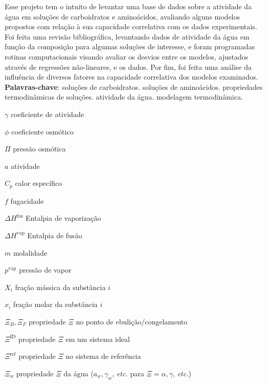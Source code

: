 \documentclass[
	12pt,				%
	openright,
	twoside,
	a4paper,			%
	english,			%
	french,				%
	spanish,			%
	brazil				%
	]{abntex2}
\begin{document}

\frenchspacing

\imprimircapa

\imprimirfolhaderosto


\setlength{\absparsep}{18pt}
\begin{resumo}
	Esse projeto tem o intuito de levantar uma base de dados sobre a
	atividade da água em soluções de carboidratos e aminoácidos,
	avaliando alguns modelos propostos com relação à sua capacidade
	correlativa com os dados experimentais. Foi feita uma revisão
	bibliográfica, levantando dados de atividade da água em função da
	composição para algumas soluções de interesse, e foram programadas
	rotinas computacionais visando avaliar os desvios entre os modelos,
	ajustados através de regressões não-lineares, e os dados. Por fim,
	foi feita uma análise da influência de diversos fatores na capacidade
	correlativa dos modelos examinados.\\
	\textbf{Palavras-chave}: soluções de carboidratos.
			soluções de aminoácidos.
			propriedades termodinâmicas de soluções.
			atividade da água.
			modelagem termodinâmica.
\end{resumo}

\listoffigures*
\cleardoublepage


\listoftables*
\cleardoublepage

\begin{simbolos}
	\item[$ \gamma $] coeficiente de atividade
	\item[$ \phi $] coeficiente osmótico
	\item[$ \Pi $] pressão osmótica
	\item[$ a $] atividade
	\item[$ C_p $] calor específico
	\item[$ f $] fugacidade
	\item[$ \Delta H^\text{fus} $] Entalpia de vaporização
	\item[$ \Delta H^\text{vap} $] Entalpia de fusão
	\item[$ m $] molalidade
	\item[$ p^\text{vap} $] pressão de vapor
	\item[$ X_i $] fração mássica da substância $i$
	\item[$ x_i $] fração molar da substância $i$
	\item[$ \Xi_B, \Xi_F $] propriedade $\Xi$ no ponto de ebulição/congelamento
	\item[$ \Xi^\text{ID} $] propriedade $\Xi$ em um sistema ideal
	\item[$ \Xi^\text{ref} $] propriedade $\Xi$ no sistema de referência
	\item[$ \Xi_w $] propriedade $\Xi$ da água ($a_w, \gamma_w$, \textit{etc.} %
		para $\Xi = \alpha, \gamma$, \textit{etc.})
\end{simbolos}
\end{document}
